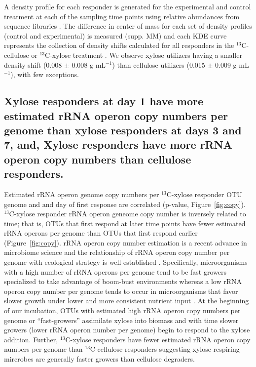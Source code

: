 A density profile for each responder is generated for the experimental and
control treatment at each of the sampling time points using relative abundances
from sequence libraries . The difference in center of mass for each set of
density profiles (control and experimental) is measured (supp. MM) and each KDE
curve represents the collection of density shifts calculated for all responders
in the $^{13}$C-cellulose or $^{13}$C-xylose treatment . We observe xylose
utilizers having a smaller density shift (0.008 $\pm$ 0.008 g mL$^{-1}$) than
cellulose utilizers (0.015 $\pm$ 0.009 g mL$^{-1}$), with few exceptions. 

\subsection{Xylose responders at day 1 have more estimated rRNA operon copy numbers per genome
than xylose responders at days 3 and 7, and, Xylose responders have more rRNA operon copy numbers
than cellulose responders.}
Estimated rRNA operon genome copy numbers per $^{13}$C-xylose responder OTU
genome and and day of first response are correlated (p-value,
Figure~\ref{fig:copy}). $^{13}$C-xylose responder rRNA operon geneome copy
number is inversely related to time; that is, OTUs that first respond at later
time points have fewer estimated rRNA operons per genome than OTUs that first
respond earlier (Figure~\ref{fig:copy}). rRNA operon copy number estimation is a recent advance in
microbiome science \citep{Kembel_2012} and the relationship of rRNA operon copy
number per genome with ecological strategy is well established
\citep{Klappenbach_2000}. Specifically, microorganisms with a high number of
rRNA operons per genome tend to be fast growers specialized to take advantage
of boom-bust environments whereas a low rRNA operon copy number per genome
tends to occur in microorganisms that favor slower growth under lower and more
consistent nutrient input \citep{Klappenbach_2000}. At the beginning of our
incubation, OTUs with estimated high rRNA operon copy numbers per genome or
``fast-growers'' assimilate xylose into biomass and with time slower growers
(lower rRNA operon number per genome) begin to respond to the xylose addition.
Further, $^{13}$C-xylose responders have fewer estimated rRNA operon copy
numbers per genome than $^{13}$C-cellulose responders suggesting xylose
respiring mircrobes are generally faster growers than cellulose degraders.


